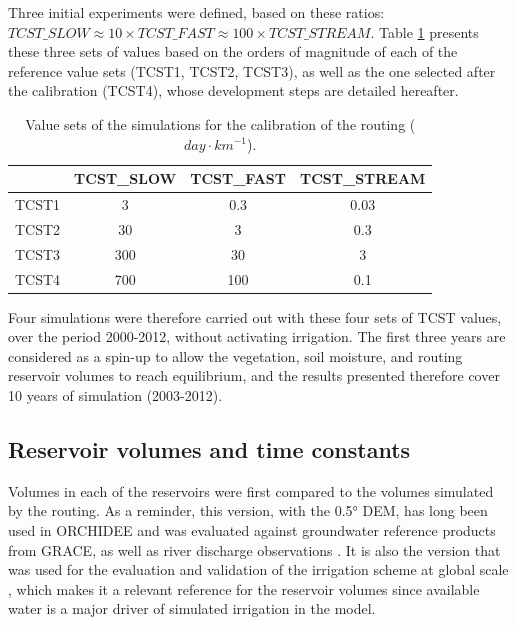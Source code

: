 Three initial experiments were defined, based on these ratios:\\$TCST\_SLOW \approx 10 \times TCST\_FAST \approx 100 \times TCST\_STREAM$.
Table \ref{table:tcst_exp} presents these three sets of values based on the orders of magnitude of each of the reference value sets (TCST1, TCST2, TCST3), as well as the one selected after the calibration (TCST4), whose development steps are detailed hereafter.

\begin{table}[h]
\centering
\begin{tabular}{|l|c|c|c|}
\hline
\textbf{} & \textbf{TCST\_SLOW} & \textbf{TCST\_FAST} & \textbf{TCST\_STREAM} \\ \hline
TCST1 & 3 & 0.3 & 0.03 \\ \hline
TCST2 & 30 & 3 & 0.3 \\ \hline
TCST3 & 300 & 30 & 3 \\ \hline
TCST4 & 700 & 100 & 0.1 \\ \hline
\end{tabular}
\caption{Value sets of the simulations for the calibration of the \native routing ($day \cdot km^{-1}$).}
\label{table:tcst_exp}
\end{table}

Four simulations were therefore carried out with these four sets of TCST values, over the period 2000-2012, without activating irrigation.
The first three years are considered as a spin-up to allow the vegetation, soil moisture, and routing reservoir volumes to reach equilibrium, and the results presented therefore cover 10 years of simulation (2003-2012). %

\subsection{Reservoir volumes and time constants}

Volumes in each of the reservoirs were first compared to the volumes simulated by the \std routing. As a reminder, this version, with the 0.5° DEM, has long been used in ORCHIDEE and was evaluated against groundwater reference products from GRACE, as well as river discharge observations  \citep{ngo-duc_53-year_2005, ngo-duc_validation_2007}.
It is also the version that was used for the evaluation and validation of the irrigation scheme at global scale \citep{arboleda-obando_validation_2024}, which makes it a relevant reference for the reservoir volumes since available water is a major driver of simulated irrigation in the model. 

